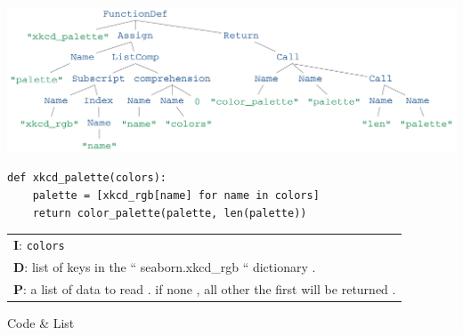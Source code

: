 \begin{listing}[h!] 
\includegraphics[width=0.8\linewidth]{ImagesCodeRelated/xkcd_palette_strip.png}
\begin{verbatim}
def xkcd_palette(colors):
    palette = [xkcd_rgb[name] for name in colors]
    return color_palette(palette, len(palette))

\end{verbatim}
\begin{tabular}{l}
\textbf{I}: \texttt{colors}\\
\textbf{D}: list of keys in the `` seaborn.xkcd\_rgb `` dictionary .\\
\textbf{P}: a list of data to read . if none , all other the first will be returned .\\
\end{tabular}

\caption{Code \& List}
\end{listing}

